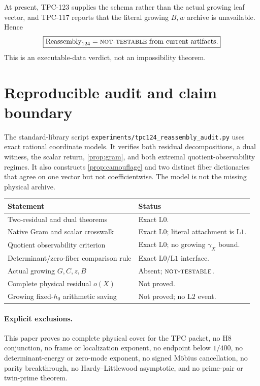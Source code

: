 \documentclass[11pt]{article}
\theoremstyle{definition}
\theoremstyle{remark}
\newcommand{\Lzero}{\mathrm{L0}}
\newcommand{\Lone}{\mathrm{L1}}
\newcommand{\Ltwo}{\mathrm{L2}}
\newcommand{\NT}{\textsc{not-testable}}
\begin{document}
At present, TPC-123 supplies the schema rather than the actual
growing leaf vector, and TPC-117 reports that the literal growing
\(B,w\) archive is unavailable.  Hence
\[
 \boxed{
 \operatorname{Reassembly}_{124}
 =
 \NT\ \text{from current artifacts}.}
\]
This is an executable-data verdict, not an impossibility theorem.

\section{Reproducible audit and claim boundary}

The standard-library script
\texttt{experiments/tpc124\_reassembly\_audit.py} uses exact rational
coordinate models.  It verifies both residual decompositions, a dual
witness, the scalar return, \cref{prop:gram}, and both extremal
quotient-observability regimes.  It also constructs
\cref{prop:camouflage} and two distinct fiber dictionaries that agree
on one vector but not coefficientwise.  The model is not the missing
physical archive.

\begin{center}
\small
\begin{tabularx}{\textwidth}{@{}P{0.40\textwidth}Y@{}}
\toprule
Statement & Status\\
\midrule
Two-residual and dual theorems
& Exact \(\Lzero\).\\
Native Gram and scalar crosswalk
& Exact \(\Lzero\); literal attachment is \(\Lone\).\\
Quotient observability criterion
& Exact \(\Lzero\); no growing \(\gamma_X\) bound.\\
Determinant/zero-fiber comparison rule
& Exact \(\Lzero/\Lone\) interface.\\
Actual growing \(G,C,z,B\)
& Absent; \(\NT\).\\
Complete physical residual \(o(X)\)
& Not proved.\\
Growing fixed-\(h_0\) arithmetic saving
& Not proved; no \(\Ltwo\) event.\\
\bottomrule
\end{tabularx}
\end{center}

\paragraph{Explicit exclusions.}
This paper proves no complete physical cover for the TPC packet, no
H8 conjunction, no frame or localization exponent, no endpoint below
\(1/400\), no determinant-energy or zero-mode exponent, no signed
M\"obius cancellation, no parity breakthrough, no Hardy--Littlewood
asymptotic, and no prime-pair or twin-prime theorem.

\begingroup
\small
\setlength{\bibsep}{2pt plus 0.3ex}
\sloppy


\endgroup
\end{document}
